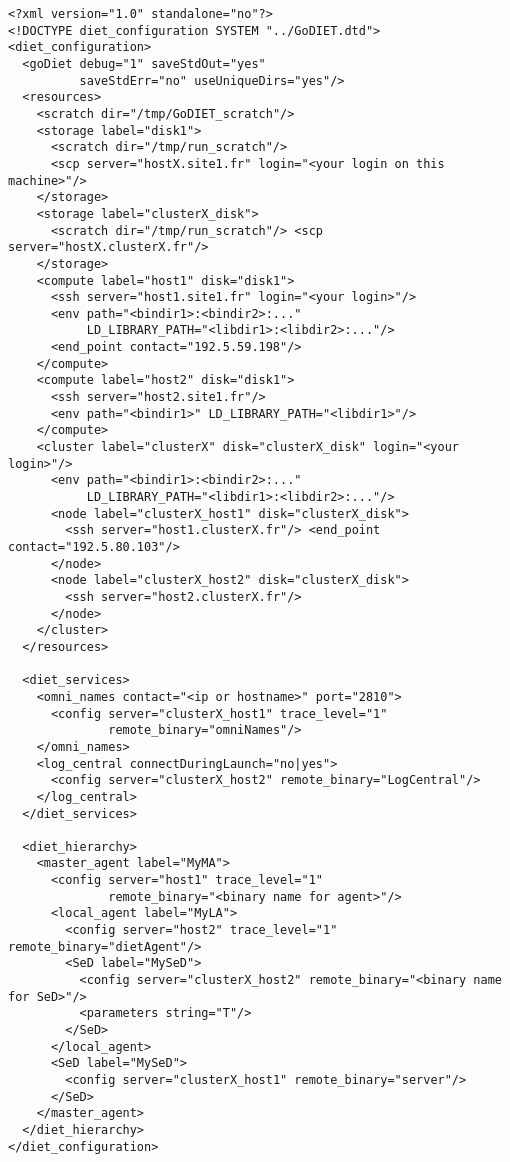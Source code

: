
\begin{lstlisting}
<?xml version="1.0" standalone="no"?>
<!DOCTYPE diet_configuration SYSTEM "../GoDIET.dtd">
<diet_configuration>
  <goDiet debug="1" saveStdOut="yes" 
          saveStdErr="no" useUniqueDirs="yes"/>
  <resources>
    <scratch dir="/tmp/GoDIET_scratch"/>
    <storage label="disk1">
      <scratch dir="/tmp/run_scratch"/>
      <scp server="hostX.site1.fr" login="<your login on this machine>"/>
    </storage>
    <storage label="clusterX_disk">
      <scratch dir="/tmp/run_scratch"/> <scp server="hostX.clusterX.fr"/>
    </storage>
    <compute label="host1" disk="disk1">
      <ssh server="host1.site1.fr" login="<your login>"/>
      <env path="<bindir1>:<bindir2>:..."
           LD_LIBRARY_PATH="<libdir1>:<libdir2>:..."/>
      <end_point contact="192.5.59.198"/>
    </compute>
    <compute label="host2" disk="disk1">
      <ssh server="host2.site1.fr"/>
      <env path="<bindir1>" LD_LIBRARY_PATH="<libdir1>"/>
    </compute>
    <cluster label="clusterX" disk="clusterX_disk" login="<your login>"/>
      <env path="<bindir1>:<bindir2>:..."
           LD_LIBRARY_PATH="<libdir1>:<libdir2>:..."/>
      <node label="clusterX_host1" disk="clusterX_disk">
        <ssh server="host1.clusterX.fr"/> <end_point contact="192.5.80.103"/>
      </node>
      <node label="clusterX_host2" disk="clusterX_disk">
        <ssh server="host2.clusterX.fr"/>
      </node>
    </cluster>
  </resources>
 
  <diet_services>
    <omni_names contact="<ip or hostname>" port="2810">
      <config server="clusterX_host1" trace_level="1" 
              remote_binary="omniNames"/>
    </omni_names>
    <log_central connectDuringLaunch="no|yes">
      <config server="clusterX_host2" remote_binary="LogCentral"/>
    </log_central>
  </diet_services>
 
  <diet_hierarchy>
    <master_agent label="MyMA">
      <config server="host1" trace_level="1"
              remote_binary="<binary name for agent>"/>
      <local_agent label="MyLA">
        <config server="host2" trace_level="1" remote_binary="dietAgent"/>
        <SeD label="MySeD">
          <config server="clusterX_host2" remote_binary="<binary name for SeD>"/>
          <parameters string="T"/>
        </SeD>
      </local_agent>
      <SeD label="MySeD">
        <config server="clusterX_host1" remote_binary="server"/>
      </SeD>
    </master_agent>
  </diet_hierarchy>      
</diet_configuration>
\end{lstlisting}


